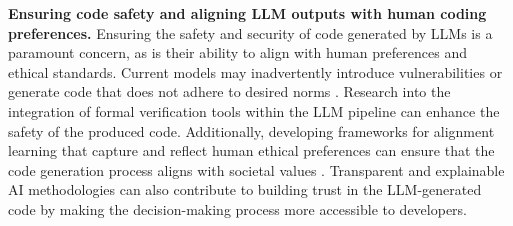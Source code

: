 \textbf{Ensuring code safety and aligning LLM outputs with human coding preferences.}
Ensuring the safety and security of code generated by LLMs is a paramount concern, as is their ability to align with human preferences and ethical standards. Current models may inadvertently introduce vulnerabilities or generate code that does not adhere to desired norms \cite{chen2021evaluating,yang2024robustness}.
Research into the integration of formal verification tools within the LLM pipeline can enhance the safety of the produced code. Additionally, developing frameworks for alignment learning that capture and reflect human ethical preferences can ensure that the code generation process aligns with societal values \cite{ouyang2022training,qi2023fine}. Transparent and explainable AI methodologies can also contribute to building trust in the LLM-generated code by making the decision-making process more accessible to developers.